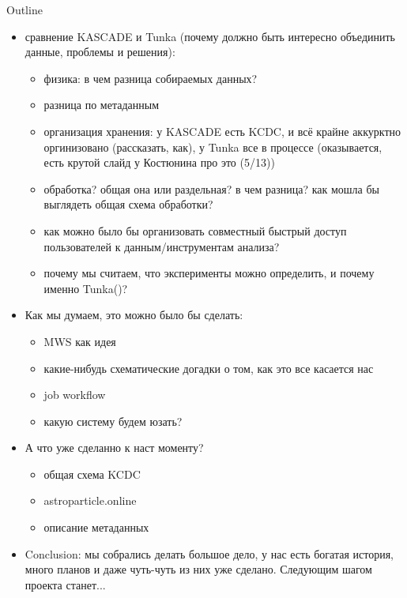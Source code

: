 \documentclass[18pt]{beamer}
\begin{document}
\begin{frame}[allowframebreaks]{Outline}
\begin{itemize}
 \item сравнение KASCADE и Tunka (почему должно быть интересно объединить данные, проблемы и решения):
 \begin{itemize}
    \item физика: в чем разница собираемых данных?
    \item разница по метаданным
    \item организация хранения: у KASCADE есть KCDC, и всё крайне аккурктно оргинизовано (рассказать, как),
    у Tunka все в процессе (оказывается, есть крутой слайд у Костюнина про это (5/13))
    \item обработка? общая она или раздельная? в чем разница? как мошла бы выглядеть общая схема обработки?
    \item как можно было бы организовать совместный быстрый доступ пользователей к данным/инструментам анализа?
    \item почему мы считаем, что эксперименты можно определить, и почему именно Tunka()?
 \end{itemize}
 \item Как мы думаем, это можно было бы сделать:
    \begin{itemize}
        \item MWS как идея
        \item какие-нибудь схематические догадки о том, как это все касается нас
        \item job workflow
        \item какую систему будем юзать?
\end{itemize}
\item А что уже сделанно к наст моменту?
    \begin{itemize}
     \item общая схема KCDC
     \item astroparticle.online
     \item описание метаданных
    \end{itemize}
\item Conclusion: мы собрались делать большое дело, у нас есть богатая история, много планов и даже чуть-чуть из них уже сделано. Следующим шагом проекта станет...
\end{itemize}

\end{frame}
\end{document}
